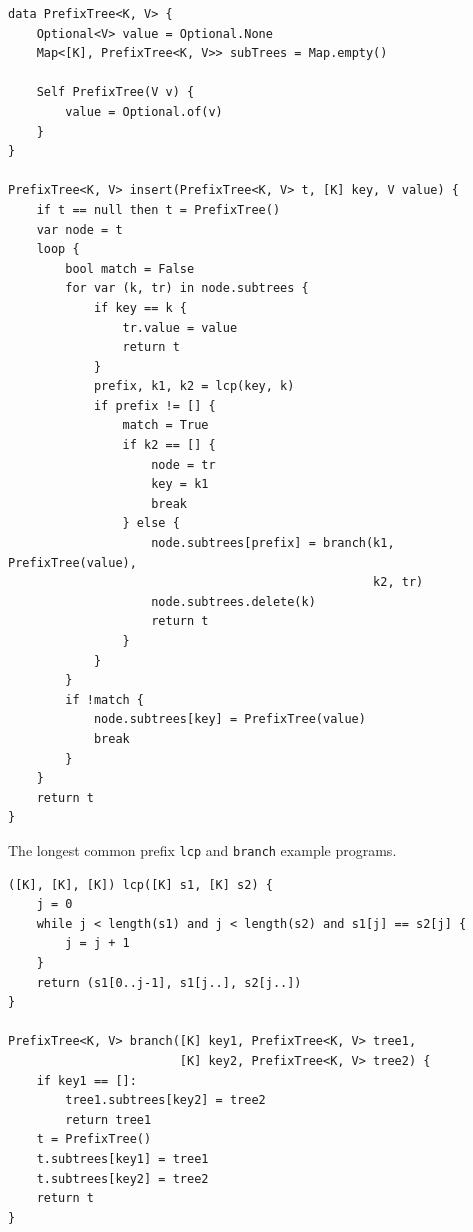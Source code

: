 \documentclass[b5paper]{article}
\begin{document}
\begin{lstlisting}[language = Bourbaki]
data PrefixTree<K, V> {
    Optional<V> value = Optional.None
    Map<[K], PrefixTree<K, V>> subTrees = Map.empty()

    Self PrefixTree(V v) {
        value = Optional.of(v)
    }
}

PrefixTree<K, V> insert(PrefixTree<K, V> t, [K] key, V value) {
    if t == null then t = PrefixTree()
    var node = t
    loop {
        bool match = False
        for var (k, tr) in node.subtrees {
            if key == k {
                tr.value = value
                return t
            }
            prefix, k1, k2 = lcp(key, k)
            if prefix != [] {
                match = True
                if k2 == [] {
                    node = tr
                    key = k1
                    break
                } else {
                    node.subtrees[prefix] = branch(k1, PrefixTree(value),
                                                   k2, tr)
                    node.subtrees.delete(k)
                    return t
                }
            }
        }
        if !match {
            node.subtrees[key] = PrefixTree(value)
            break
        }
    }
    return t
}
\end{lstlisting}

The longest common prefix \texttt{lcp} and \texttt{branch} example programs.

\begin{lstlisting}[language = Bourbaki]
([K], [K], [K]) lcp([K] s1, [K] s2) {
    j = 0
    while j < length(s1) and j < length(s2) and s1[j] == s2[j] {
        j = j + 1
    }
    return (s1[0..j-1], s1[j..], s2[j..])
}

PrefixTree<K, V> branch([K] key1, PrefixTree<K, V> tree1,
                        [K] key2, PrefixTree<K, V> tree2) {
    if key1 == []:
        tree1.subtrees[key2] = tree2
        return tree1
    t = PrefixTree()
    t.subtrees[key1] = tree1
    t.subtrees[key2] = tree2
    return t
}
\end{lstlisting}
\end{document}

